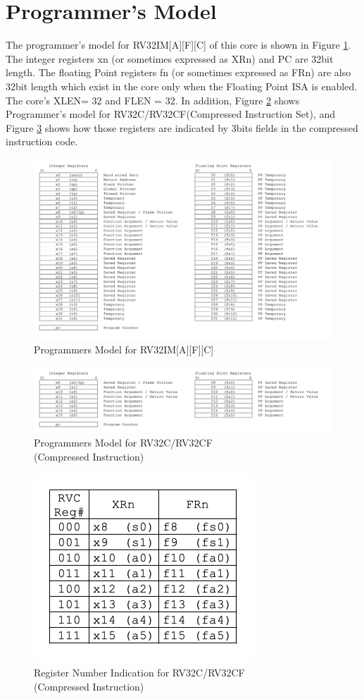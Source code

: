 \section{Programmer's Model}

The programmer’s model for RV32IM[A][F][C] of this core is shown in Figure \ref{fig:PROGRAMMERSMODEL_RV32IMAFC}. The integer registers xn (or sometimes expressed as XRn) and PC are 32bit length. The floating Point registers fn (or sometimes expressed as FRn) are also 32bit length which exist in the core only when the Floating Point ISA is enabled. The core’s XLEN= 32 and FLEN = 32. In addition, Figure \ref{fig:PROGRAMMERSMODEL_RV32CF} shows Programmer’s model for RV32C/RV32CF(Compressed Instruction Set), and Figure \ref{fig:PROGRAMMERSMODEL_RV32CF_REGNUM} shows how those registers are indicated by 3bits fields in the compressed instruction code. 

\begin{figure}[H]
    \includegraphics[width=0.9\columnwidth]{./Figure/ProgrammersModel_RV32IMAFC.png}
    \caption{Programmers Model for RV32IM[A][F][C]}
    \label{fig:PROGRAMMERSMODEL_RV32IMAFC}
\end{figure}

\begin{figure}[H]
    \includegraphics[width=0.9\columnwidth]{./Figure/ProgrammersModel_RV32CF.png}
    \caption{Programmers Model for RV32C/RV32CF\\(Compressed Instruction)}
    \label{fig:PROGRAMMERSMODEL_RV32CF}
\end{figure}

\begin{figure}[H]
    \includegraphics[width=0.2\columnwidth]{./Figure/ProgrammersModel_RV32CF_RegNum.png}
    \caption{Register Number Indication for RV32C/RV32CF\\(Compressed Instruction)}
    \label{fig:PROGRAMMERSMODEL_RV32CF_REGNUM}
\end{figure}

